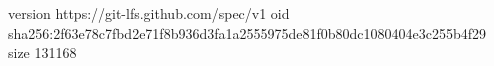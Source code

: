 version https://git-lfs.github.com/spec/v1
oid sha256:2f63e78c7fbd2e71f8b936d3fa1a2555975de81f0b80dc1080404e3c255b4f29
size 131168
